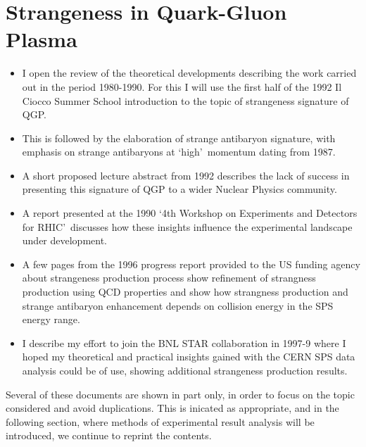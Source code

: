 \section{Strangeness in  Quark-Gluon Plasma}
\begin{itemize}
\item
I open the review of the theoretical developments describing the work carried out in the period  1980-1990. For this I will use the first half of the 1992 Il Ciocco Summer School introduction to the topic of strangeness signature of QGP.  
\item
This is followed by the elaboration of strange antibaryon signature, with emphasis on strange antibaryons at \lq high\rq\ momentum dating from 1987. 
\item
A short proposed lecture abstract from 1992 describes the lack of success in presenting this signature of QGP to a wider Nuclear Physics community.  
\item
A report presented  at the 1990  \lq 4th Workshop on  Experiments and Detectors for RHIC\rq\ discusses how these insights influence the experimental landscape under development. 
\item
A few pages from  the 1996 progress report provided to the US funding agency about strangeness production process show refinement of strangness production using QCD properties and show how strangness production and strange antibaryon enhancement depends on collision energy in the SPS energy range. 
\item 
I describe my effort to join the BNL STAR collaboration in 1997-9 where I hoped my theoretical and practical insights gained with the CERN SPS data analysis could be of use, showing additional strangeness production results.
\end{itemize}
Several of these documents are shown in part only, in order to focus on the topic considered and avoid duplications. This is inicated as appropriate, and  in the following section, where methods of experimental result analysis will be introduced, we continue to reprint the contents.

 
